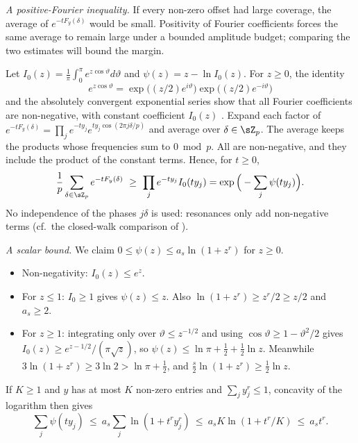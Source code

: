 \emph{A positive-Fourier inequality.} If every non-zero offset had large coverage, the average of $e^{-tF_y(\delta)}$ would be small. Positivity of Fourier coefficients forces the same average to remain large under a bounded amplitude budget; comparing the two estimates will bound the margin.

Let $I_0(z)=\frac1\pi\int_0^\pi e^{z\cos\vartheta}d\vartheta$ and $\psi(z)=z-\ln I_0(z)$. For $z\ge0$, the identity
\[
e^{z\cos\vartheta}=\exp\big((z/2)e^{i\vartheta}\big)\exp\big((z/2)e^{-i\vartheta}\big)
\]
and the absolutely convergent exponential series show that all Fourier coefficients are non-negative, with constant coefficient $I_0(z)$ \citep[Eqs.~10.32.1, 10.35.2]{dlmf}. Expand each factor of $e^{-tF_y(\delta)}=\prod_je^{-ty_j}e^{ty_j\cos(2\pi j\delta/p)}$ and average over $\delta\in\sZ_p$. The average keeps the products whose frequencies sum to $0\bmod p$. All are non-negative, and they include the product of the constant terms. Hence, for $t\ge0$,
\begin{equation}
\frac1p\sum_{\delta\in\sZ_p}e^{-tF_y(\delta)}\ \ge\ \prod_je^{-ty_j}I_0(ty_j)=\exp\Big(-\sum_j\psi(ty_j)\Big).
\label{eq:posfourier}
\end{equation}
No independence of the phases $j\delta$ is used: resonances only add non-negative terms (cf.\ the closed-walk comparison of \citealp{cioaba2006closed}).

\emph{A scalar bound.} We claim $0\le\psi(z)\le a_s\ln(1+z^r)$ for $z\ge0$.
\begin{itemize}
\item Non-negativity: $I_0(z)\le e^z$.
\item For $z\le1$: $I_0\ge1$ gives $\psi(z)\le z$. Also $\ln(1+z^r)\ge z^r/2\ge z/2$ and $a_s\ge2$.
\item For $z\ge1$: integrating only over $\vartheta\le z^{-1/2}$ and using $\cos\vartheta\ge1-\vartheta^2/2$ gives $I_0(z)\ge e^{z-1/2}/(\pi\sqrt z)$, so $\psi(z)\le\ln\pi+\frac12+\frac12\ln z$. Meanwhile $3\ln(1+z^r)\ge3\ln2>\ln\pi+\frac12$, and $\frac s2\ln(1+z^r)\ge\frac12\ln z$.
\end{itemize}

If $K\ge1$ and $y$ has at most $K$ non-zero entries and $\sum_jy_j^r\le1$, concavity of the logarithm then gives
\begin{equation}
\sum_j\psi(ty_j)\ \le\ a_s\sum_j\ln(1+t^ry_j^r)\ \le\ a_sK\ln(1+t^r/K)\ \le\ a_st^r .
\label{eq:psisum}
\end{equation}


